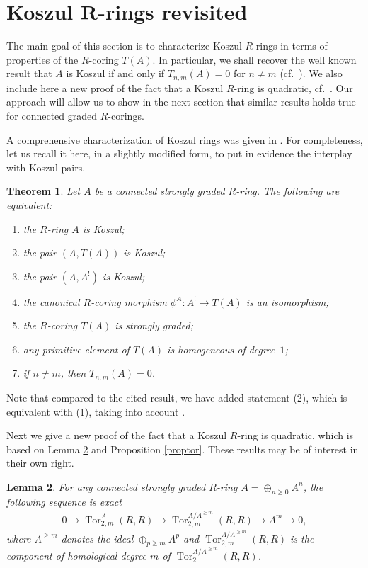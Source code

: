 \documentclass[pdftex]{sigma}
\renewcommand{\^}[1]{\mbox{$^{\left( #1 \right)}$}}
\renewcommand{\_}[1]{\mbox{$_{\left( #1 \right)}$}}
\numberwithin{equation}{section}
\newtheorem{Theorem}{Theorem}[section]
\newtheorem{Lemma}[Theorem]{Lemma}
\begin{document}
\section[Koszul $R$-rings revisited]{Koszul $\boldsymbol{R}$-rings revisited}\label{section3}

The main goal of this section is to characterize Koszul $R$-rings in terms of properties of the $R$-coring $T(A)$. In particular, we shall recover the well known result that $A$ is Koszul if and only if $T_{n,m}(A)=0$ for $n\neq m$ (cf.~\cite[Theorem~1.9(6)]{mst}). We also include here a new proof of the fact that a Koszul $R$-ring is quadratic, cf.~\cite[Proposition~1.2.3]{bgs}. Our approach will allow us to show in the next section that similar results holds true for connected graded $R$-corings.

A comprehensive characterization of Koszul rings was given in \cite[Theorem~1.10]{mst}. For completeness, let us recall it here, in a slightly modif\/ied form, to put in evidence the interplay with Koszul pairs.

\begin{Theorem}\label{t-k7}
Let $A$ be a connected strongly graded $R$-ring. The following are equivalent:
\begin{enumerate}\itemsep=0pt
\item[$(1)$] the $R$-ring $A$ is Koszul;
\item[$(2)$] the pair $(A,T(A))$ is Koszul;
\item[$(3)$] the pair $(A,A^!)$ is Koszul;
\item[$(4)$] the canonical $R$-coring morphism $\phi^A \colon A^! \to T(A)$ is an isomorphism;
\item[$(5)$] the $R$-coring $T(A)$ is strongly graded;
\item[$(6)$] any primitive element of $T(A)$ is homogeneous of degree~$1$;
\item[$(7)$] if $n \neq m$, then $T_{n,m}(A) = 0$.	
\end{enumerate}
\end{Theorem}

Note that compared to the cited result, we have added statement (2), which is equivalent with (1), taking into account \cite[Theorem 2.13]{jps}.

Next we give a new proof of the fact that a Koszul $R$-ring is quadratic, which is based on Lemma \ref{lemator} and Proposition \ref{proptor}. These results may be of interest in their own right.

\begin{Lemma} \label{lemator}
For any connected strongly graded $R$-ring $A=\oplus_{n \geq 0} A^n$, the following sequence is exact
\begin{gather*}0 \longrightarrow\operatorname{Tor}^A_{2,m}(R,R) \rightarrow \operatorname{Tor}_{2,m}^{A/{A^{\geq m}}}(R,R)\rightarrow A^m \rightarrow 0,
\end{gather*}
where $A^{\geq m}$ denotes the ideal $\oplus_{p \geq m} A^p$ and $\operatorname{Tor}_{2,m}^{A/A^{\geq m}}(R,R)$ is the component of homological degree $m$ of $\operatorname{Tor}_2^{A/A^{\geq m}}(R,R)$.
\end{Lemma}
\end{document}
